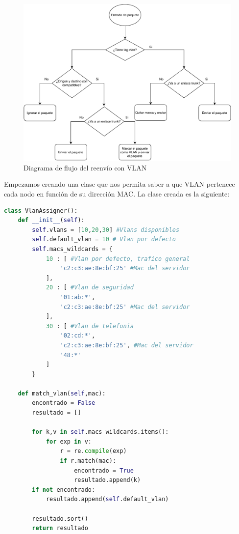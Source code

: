 \begin{figure}[!h]
    \centering
    \includegraphics[width=\textwidth]{imagenes/figuras/decisiones_vlan.pdf}
    \caption{Diagrama de flujo del reenvío con VLAN}
    \label{fig:decisiones-vlan1}
\end{figure}

Empezamos creando una clase que nos permita saber a que VLAN pertenece cada nodo en función de su dirección MAC. La clase creada es la siguiente:

\begin{lstlisting}[language=Python, label=lst:vlan-assigner, caption={Clase encargada de determinar a que VLAN pertenece un nodo}]
class VlanAssigner():
    def __init__(self):
        self.vlans = [10,20,30] #Vlans disponibles
        self.default_vlan = 10 # Vlan por defecto
        self.macs_wildcards = {
            10 : [ #Vlan por defecto, trafico general
                'c2:c3:ae:8e:bf:25' #Mac del servidor
            ],
            20 : [ #Vlan de seguridad
                '01:ab:*',
                'c2:c3:ae:8e:bf:25' #Mac del servidor
            ],
            30 : [ #Vlan de telefonia
                '02:cd:*',
                'c2:c3:ae:8e:bf:25', #Mac del servidor
                '48:*'
            ]
        }

    def match_vlan(self,mac):
        encontrado = False
        resultado = []

        for k,v in self.macs_wildcards.items():
            for exp in v:
                r = re.compile(exp)
                if r.match(mac):
                    encontrado = True
                    resultado.append(k)
        if not encontrado:
            resultado.append(self.default_vlan)
        
        resultado.sort()
        return resultado
\end{lstlisting}

